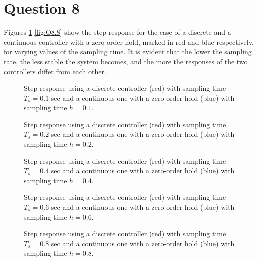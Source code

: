 \section{Question 8}

Figures \ref{fig:Q8.01}-\ref{fig:Q8.8} show the step response for the case of a
discrete and a continuous controller with a zero-order hold, marked in red and
blue respectively, for varying values of the sampling time. It is evident that
the lower the sampling rate, the less stable the system becomes, and the more
the responses of the two controllers differ from each other.

\begin{figure}[H]\centering
	\centering
	\scalebox{1}{}
  \caption{Step response using a discrete controller (red) with sampling time
    $T_s = 0.1$ sec and a continuous one with a zero-order hold (blue) with
    sampling time $h=0.1$.}
  \label{fig:Q8.01}
\end{figure}

\begin{figure}[H]\centering
	\centering
	\scalebox{1}{}
  \caption{Step response using a discrete controller (red) with sampling time
    $T_s = 0.2$ sec and a continuous one with a zero-order hold (blue) with
    sampling time $h=0.2$.}
  \label{fig:Q8.02}
\end{figure}

\begin{figure}[H]\centering
	\centering
	\scalebox{1}{}
  \caption{Step response using a discrete controller (red) with sampling time
    $T_s = 0.4$ sec and a continuous one with a zero-order hold (blue) with
    sampling time $h=0.4$.}
  \label{fig:Q8.04}
\end{figure}

\begin{figure}[H]\centering
	\centering
	\scalebox{1}{}
  \caption{Step response using a discrete controller (red) with sampling time
    $T_s = 0.6$ sec and a continuous one with a zero-order hold (blue) with
    sampling time $h=0.6$.}
  \label{fig:Q8.06}
\end{figure}

\begin{figure}[H]\centering
	\centering
	\scalebox{1}{}
  \caption{Step response using a discrete controller (red) with sampling time
    $T_s = 0.8$ sec and a continuous one with a zero-order hold (blue) with
    sampling time $h=0.8$.}
  \label{fig:Q8.08}
\end{figure}

